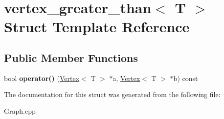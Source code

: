 \hypertarget{structvertex__greater__than}{}\section{vertex\+\_\+greater\+\_\+than$<$ T $>$ Struct Template Reference}
\label{structvertex__greater__than}
\subsection*{Public Member Functions}
\begin{DoxyCompactItemize}
\item 
\mbox{\label{structvertex__greater__than_acb041eee618f7d56a3685c7aaf347df6}} 
bool {\bfseries operator()} (\hyperlink{class_vertex}{Vertex}$<$ T $>$ $\ast$a, \hyperlink{class_vertex}{Vertex}$<$ T $>$ $\ast$b) const
\end{DoxyCompactItemize}


The documentation for this struct was generated from the following file\+:\begin{DoxyCompactItemize}
\item 
Graph.\+cpp\end{DoxyCompactItemize}
